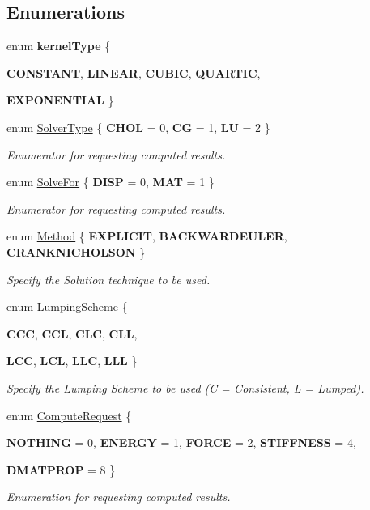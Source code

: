\subsection*{Enumerations}
\begin{DoxyCompactItemize}
\item 
enum {\bfseries kernelType} \{ \par
{\bfseries CONSTANT}, 
{\bfseries LINEAR}, 
{\bfseries CUBIC}, 
{\bfseries QUARTIC}, 
\par
{\bfseries EXPONENTIAL}
 \}
\item 
enum \hyperlink{namespacevoom_a2874640a1124292b983171d745088fef}{SolverType} \{ {\bfseries CHOL} =  0, 
{\bfseries CG} =  1, 
{\bfseries LU} =  2
 \}
\begin{DoxyCompactList}\small\item\em Enumerator for requesting computed results. \item\end{DoxyCompactList}\item 
enum \hyperlink{namespacevoom_a6dc64c378b8a785d6a835fe4d27b5588}{SolveFor} \{ {\bfseries DISP} =  0, 
{\bfseries MAT} =  1
 \}
\begin{DoxyCompactList}\small\item\em Enumerator for requesting computed results. \item\end{DoxyCompactList}\item 
enum \hyperlink{namespacevoom_aa7998516d4918c6d10beb11401158a43}{Method} \{ {\bfseries EXPLICIT}, 
{\bfseries BACKWARDEULER}, 
{\bfseries CRANKNICHOLSON}
 \}
\begin{DoxyCompactList}\small\item\em Specify the Solution technique to be used. \item\end{DoxyCompactList}\item 
enum \hyperlink{namespacevoom_aad2b72d6024982ad6a82eccb9698964e}{LumpingScheme} \{ \par
{\bfseries CCC}, 
{\bfseries CCL}, 
{\bfseries CLC}, 
{\bfseries CLL}, 
\par
{\bfseries LCC}, 
{\bfseries LCL}, 
{\bfseries LLC}, 
{\bfseries LLL}
 \}
\begin{DoxyCompactList}\small\item\em Specify the Lumping Scheme to be used (C = Consistent, L = Lumped). \item\end{DoxyCompactList}\item 
enum \hyperlink{namespacevoom_a449acd18e685696f17351ba84a9ac7fb}{ComputeRequest} \{ \par
{\bfseries NOTHING} =  0, 
{\bfseries ENERGY} =  1, 
{\bfseries FORCE} =  2, 
{\bfseries STIFFNESS} =  4, 
\par
{\bfseries DMATPROP} =  8
 \}
\begin{DoxyCompactList}\small\item\em Enumeration for requesting computed results. \item\end{DoxyCompactList}\end{DoxyCompactItemize}
